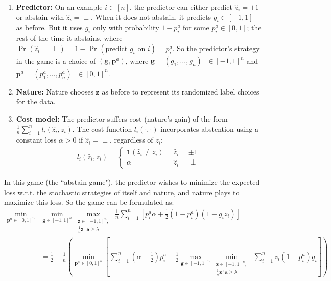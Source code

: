 \documentclass{article}[12pt]
\theoremstyle{named}
\newcommand{\va}{\mathbf{a}}
\newcommand{\vg}{\mathbf{g}}    %
\newcommand{\vp}{\mathbf{p}}
\newcommand{\vr}{\mathbf{r}}
\newcommand{\vt}{\mathbf{t}}
\newcommand{\vz}{\mathbf{z}}
\DeclareMathOperator{\Prtxt}{Pr}
\newcommand{\ifn}{\mathbf{1}} %
\newcommand{\prp}[2]{\Prtxt_{#2} \left(#1\right)}
\newcommand{\lrp}[1]{\left(#1\right)}
\begin{document}
\begin{enumerate}
\item {\bf Predictor:} 
On an example $i \in [n]$, the predictor can either predict $\hat{z}_i = \pm 1$ or abstain with $\hat{z}_i = \perp$. 
When it does not abstain, 
it predicts $g_i \in [-1,1]$ as before.
But it uses $g_i$ only with probability $1 - p_i^a$ for some $p_i^a \in [0,1]$; 
the rest of the time it abstains, 
where $\prp{\hat{z}_i = \perp}{} = 1 - \prp{\mbox{predict $g_i$ on } i}{} = p_i^a$.
So the predictor's strategy in the game is a choice of $(\vg, \vp^a)$, 
where $\vg = (g_1, \dots, g_n)^\top \in [-1,1]^n$ and $\vp^a = (p_1^a, \dots, p_n^a)^\top \in [0,1]^n$.

\item {\bf Nature:} 
Nature chooses $\vz$ as before to represent its randomized label choices for the data.

\item {\bf Cost model:} 
The predictor suffers cost (nature's gain) of the form $\frac{1}{n} \sum_{i=1}^n l_i (\hat{z}_i, z_i)$. 
The cost function $l_i (\cdot, \cdot)$ incorporates abstention using a constant loss $\alpha > 0$ 
if $\hat{z}_i = \perp$, regardless of $z_i$:
\begin{align}
\label{costfnabst}
l_i (\hat{z}_i, z_i) = \begin{cases} \ifn(\hat{z}_i \neq z_i) &\;\; \hat{z}_i = \pm 1 \\
\alpha &\;\; \hat{z}_i = \perp \end{cases}
\end{align}
\end{enumerate}

In this game (the ``abstain game"), 
the predictor wishes to minimize the expected loss w.r.t. the stochastic strategies of itself and nature, 
and nature plays to maximize this loss.
So the game can be formulated as:
\begin{align}
\label{abstaingame}
\min_{\vp^a \in [0,1]^n} &\min_{\vg \in [-1,1]^n} \max_{\substack{ \vz \in [-1,1]^n , \\ \frac{1}{n} \vz^\top \va \geq \lambda }}\; 
\frac{1}{n} \sum_{i=1}^n \left[ p_i^a \alpha + \frac{1}{2} \lrp{1 - p_i^a} \lrp{ 1 - g_i z_i } \right] \nonumber \\
&= \frac{1}{2} + \frac{1}{n} \lrp{ \min_{\vp^a \in [0,1]^n} \left[ \sum_{i=1}^n \lrp{ \alpha - \frac{1}{2}} p_i^a - 
\frac{1}{2} \max_{\vg \in [-1,1]^n} \min_{\substack{ \vz \in [-1,1]^n , \\ \frac{1}{n} \vz^\top \va \geq \lambda }}\; \sum_{i=1}^n z_i \lrp{1 - p_i^a} g_i \right] }
\end{align}
\end{document}
